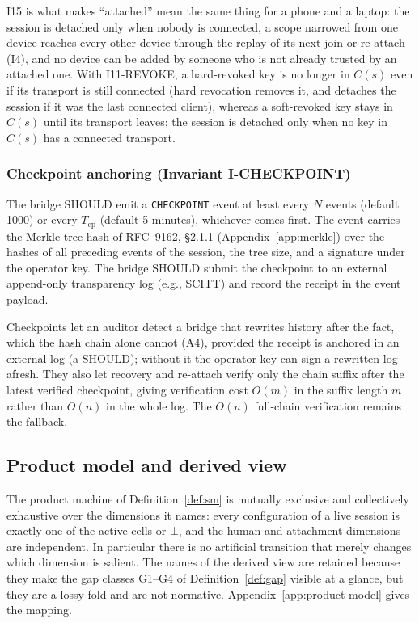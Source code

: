 I15 is what makes ``attached'' mean the same thing for a phone and a
laptop: the session is detached only when nobody is connected, a scope
narrowed from one device reaches every other device through the replay of
its next join or re-attach (I4), and no device can be added by someone who
is not already trusted by an attached one. With I11-REVOKE, a hard-revoked key is no longer in $C(s)$ even if its
transport is still connected (hard revocation removes it, and detaches the
session if it was the last connected client), whereas a
soft-revoked key stays in $C(s)$ until its transport leaves; the session
is detached only when no key in $C(s)$ has a connected transport.

\subsubsection{Checkpoint anchoring (Invariant I-CHECKPOINT)}
\label{sec:invariants-checkpoint}

\begin{invariant}\label{inv:icheckpoint}
The bridge SHOULD emit a \texttt{CHECKPOINT} event at least every $N$
events (default 1000) or every $T_{\text{cp}}$ (default 5 minutes),
whichever comes first. The event carries the Merkle tree hash of RFC~9162, \S2.1.1
(Appendix~\ref{app:merkle}) over the hashes of all preceding events of the
session, the tree size, and
a signature under the operator key. The bridge SHOULD submit the
checkpoint to an external append-only transparency log (e.g., SCITT)
and record the receipt in the event payload.
\end{invariant}

Checkpoints let an auditor detect a bridge that rewrites history after
the fact, which the hash chain alone cannot (A4), provided the receipt is
anchored in an external log (a SHOULD); without it the operator key can
sign a rewritten log afresh. They also let recovery and
re-attach verify only the chain suffix after the latest verified
checkpoint, giving verification cost $O(m)$ in the suffix length $m$
rather than $O(n)$ in the whole log. The $O(n)$ full-chain verification
remains the fallback.

\subsection{Product model and derived view}\label{sec:mece-status}

The product machine of Definition~\ref{def:sm} is mutually exclusive and
collectively exhaustive over the dimensions it names: every
configuration of a live session is exactly one of the active cells
or $\bot$, and the human and attachment dimensions are independent. In
particular there is no artificial transition that merely changes which
dimension is salient. The names of the derived view are
retained because they make the gap classes G1--G4 of
Definition~\ref{def:gap} visible at a glance, but they are a lossy fold
and are not normative. Appendix~\ref{app:product-model} gives the
mapping.

